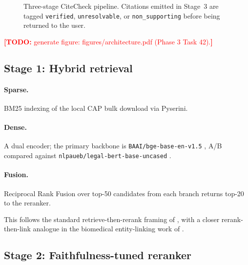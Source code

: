 \documentclass[11pt]{article}
\newcommand{\todo}[1]{\textcolor{red}{\textbf{[TODO:} #1\textbf{]}}}
\begin{document}
\begin{figure}[t]
\centering
\caption{Three-stage CiteCheck pipeline. Citations emitted in
Stage~3 are tagged \texttt{verified}, \texttt{unresolvable}, or
\texttt{non\_supporting} before being returned to the user.}
\label{fig:architecture}
\end{figure}
\todo{generate figure: figures/architecture.pdf (Phase 3 Task 42).}

\subsection{Stage 1: Hybrid retrieval}
\label{sec:method:retrieval}

\paragraph{Sparse.}
BM25 \citep{robertson2009bm25} indexing of the local CAP bulk
download via Pyserini.

\paragraph{Dense.}
A dual encoder; the primary backbone is
\texttt{BAAI/bge-base-en-v1.5} \citep{xiao2024cpack}, A/B compared
against \texttt{nlpaueb/legal-bert-base-uncased}
\citep{chalkidis2020legalbert}.

\paragraph{Fusion.}
Reciprocal Rank Fusion over top-50 candidates from each branch
returns top-20 to the reranker.

This follows the standard retrieve-then-rerank framing of
\citet{lewis2020rag}, with a closer rerank-then-link analogue in the
biomedical entity-linking work of \citet{cao2025retrievethenrerank}.

\subsection{Stage 2: Faithfulness-tuned reranker}
\label{sec:method:reranker}
\end{document}
